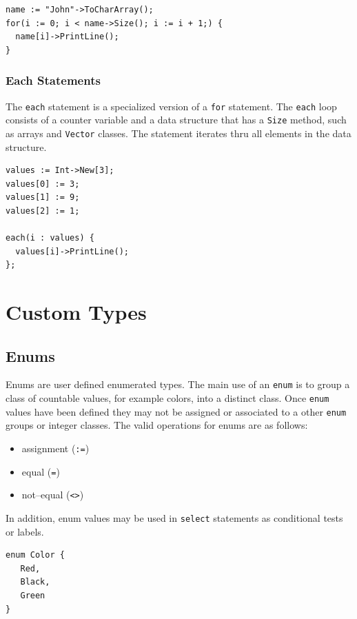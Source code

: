 \documentclass[12pt]{article}
\begin{document}
\begin{verbatim}
name := "John"->ToCharArray();
for(i := 0; i < name->Size(); i := i + 1;) {
  name[i]->PrintLine();
}
\end{verbatim}

\subsubsection{Each Statements}

The \texttt{each} statement is a specialized version of a \texttt{for}
statement.  The \texttt{each} loop consists of a counter variable and
a data structure that has a \texttt{Size} method, such as arrays and
\texttt{Vector} classes.  The statement iterates thru all elements in
the data structure.

\begin{verbatim}
values := Int->New[3];
values[0] := 3;
values[1] := 9;
values[2] := 1;

each(i : values) {
  values[i]->PrintLine();
};
\end{verbatim}

\section{Custom Types}

\subsection{Enums}
Enums are user defined enumerated types.  The main use of an
\texttt{enum} is to group a class of countable values, for example
colors, into a distinct class.  Once \texttt{enum} values have been
defined they may not be assigned or associated to a other
\texttt{enum} groups or integer classes.  The valid operations for
enums are as follows:

\begin{itemize}
\item assignment (\texttt{:=})
\item equal (\texttt{=})
\item not--equal (\texttt{<>})
\end{itemize}

In addition, enum values may be used in \texttt{select} statements as
conditional tests or labels.

\begin{verbatim}
enum Color {
   Red,
   Black,
   Green
}
\end{verbatim}
\end{document}
